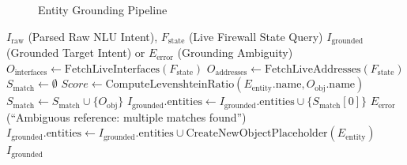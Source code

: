\begin{figure}[htbp]
    \centering
    \caption{Entity Grounding Pipeline}
    \label{fig:grounding_pipeline}
\end{figure}

\begin{algorithm}[htpb]
\caption{Dynamic Entity Grounding and Reconciliation}\label{alg:grounding}
\let\AND\undefined
\let\OR\undefined
\let\NOT\undefined
\begin{algorithmic}[1]
\REQUIRE $I_{\text{raw}}$ (Parsed Raw NLU Intent), $F_{\text{state}}$ (Live Firewall State Query)
\ENSURE $I_{\text{grounded}}$ (Grounded Target Intent) or $E_{\text{error}}$ (Grounding Ambiguity)
\STATE $O_{\text{interfaces}} \leftarrow \text{FetchLiveInterfaces}(F_{\text{state}})$
\STATE $O_{\text{addresses}} \leftarrow \text{FetchLiveAddresses}(F_{\text{state}})$
    \STATE $S_{\text{match}} \leftarrow \emptyset$
        \STATE $Score \leftarrow \text{ComputeLevenshteinRatio}(E_{\text{entity}}.\text{name}, O_{\text{obj}}.\text{name})$
            \STATE $S_{\text{match}} \leftarrow S_{\text{match}} \cup \{O_{\text{obj}}\}$
        \ENDIF
    \ENDFOR
        \STATE $I_{\text{grounded}}.\text{entities} \leftarrow I_{\text{grounded}}.\text{entities} \cup \{S_{\text{match}}[0]\}$
        \RETURN $E_{\text{error}}$ (``Ambiguous reference: multiple matches found'')
    \ELSE
        \STATE $I_{\text{grounded}}.\text{entities} \leftarrow I_{\text{grounded}}.\text{entities} \cup \text{CreateNewObjectPlaceholder}(E_{\text{entity}})$
    \ENDIF
\ENDFOR
\RETURN $I_{\text{grounded}}$
\end{algorithmic}
\end{algorithm}

